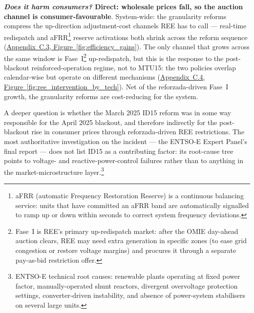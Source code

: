 \documentclass[11pt]{article}
\begin{document}
\textbf{\emph{Does it harm consumers?} Direct: wholesale prices fall, so the auction channel is consumer-favourable}. System-wide: the granularity reforms compress the up-direction adjustment-cost channels REE has to call --- real-time redispatch and aFRR\footnote{aFRR (automatic Frequency Restoration Reserve) is a continuous balancing service: units that have committed an aFRR band are automatically signalled to ramp up or down within seconds to correct system frequency deviations.} reserve activations both shrink across the reform sequence (\hyperref[fig:efficiency_gains]{Appendix~C.3, Figure~\ref*{fig:efficiency_gains}}). The only channel that grows across the same window is Fase~I\footnote{Fase~I is REE's primary up-redispatch market: after the OMIE day-ahead auction clears, REE may need extra generation in specific zones (to ease grid congestion or restore voltage margins) and procures it through a separate pay-as-bid restriction offer.} up-redispatch, but this is the response to the post-blackout reinforced-operation regime, not to MTU15: the two policies overlap calendar-wise but operate on different mechanisms (\hyperref[fig:ree_intervention_by_tech]{Appendix~C.4, Figure~\ref*{fig:ree_intervention_by_tech}}). Net of the reforzada-driven Fase~I growth, the granularity reforms are cost-reducing for the system.

A deeper question is whether the March 2025 ID15 reform was in some way responsible for the April 2025 blackout, and therefore indirectly for the post-blackout rise in consumer prices through reforzada-driven REE restrictions. The most authoritative investigation on the incident --- the ENTSO-E Expert Panel's final report \citep{entsoe_blackout_iberia_2026} --- does not list ID15 as a contributing factor: its root-cause tree points to voltage- and reactive-power-control failures rather than to anything in the market-microstructure layer.\footnote{ENTSO-E technical root causes: renewable plants operating at fixed power factor, manually-operated shunt reactors, divergent overvoltage protection settings, converter-driven instability, and absence of power-system stabilisers on several large units.}
\end{document}
